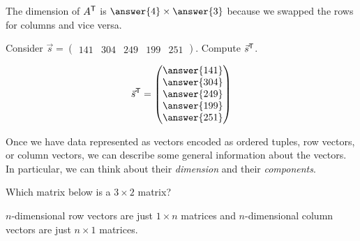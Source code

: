 \documentclass{ximera}
\begin{document}
\begin{exploration}
\begin{example}
The dimension of $A^{\mathsf{T}}$ is $\answer{4}\times \answer{3}$ because we swapped the rows for columns and vice versa.

        \end{example}

        \begin{question}
          Consider $\vec{s} = \begin{pmatrix}141 & 304 & 249 & 199 & 251 \end{pmatrix}$. Compute $\vec{s}^{\mathsf{T}}$.
          \begin{prompt}
          \[
          \vec{s}^\transpose  = \begin{pmatrix}\answer{141} \\ \answer{304} \\ \answer{249} \\ \answer{199} \\ \answer{251} \end{pmatrix}
          \]
          \end{prompt}
        \end{question}
        
        Once we have data represented as vectors encoded as ordered tuples,
        row vectors, or column vectors, we can describe some general
        information about the vectors. In particular, we can think about their
        \textit{dimension} and their \textit{components}.

        \begin{question}
          Which matrix below is a $3\times 2$ matrix?
          \begin{multipleChoice}
        
            
            
        \end{multipleChoice}
        \end{question}
        
        $n$-dimensional row vectors are just $1\times n$ matrices and
        $n$-dimensional column vectors are just $n\times 1$ matrices.

\end{exploration}
\end{document}
